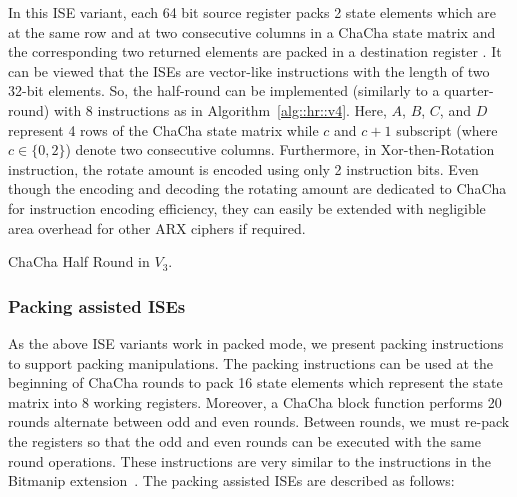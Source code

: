 In this ISE variant, each 64 bit source register packs 2 state elements which are at the same row and at two consecutive columns in a ChaCha state matrix and the corresponding two returned elements are packed in a destination register . It can be viewed that the ISEs are vector-like instructions with the length of two 32-bit elements. So, the half-round can be implemented (similarly to a quarter-round) with 8 instructions as in Algorithm~\ref{alg::hr::v4}. Here, $A$, $B$, $C$, and $D$ represent 4 rows of the ChaCha state matrix while $c$ and $c+1$ subscript (where $c \in\{0,2\}$) denote two consecutive columns.
Furthermore, in Xor-then-Rotation instruction, the rotate amount  is encoded using only 2 instruction bits.
Even though the encoding and decoding the rotating amount are dedicated to ChaCha for instruction encoding efficiency, 
they can easily be extended with negligible area overhead for other ARX ciphers if required.

\begin{algorithm}
\BlankLine
{}
\caption{ChaCha Half Round in $V_3$.}
\label{alg::hr::v4}
\end{algorithm}

\subsubsection{Packing assisted ISEs}
As the above ISE variants work in packed mode, we present packing instructions to support packing manipulations.
The packing instructions can be used at the beginning of ChaCha rounds to pack 16 state elements which represent the state matrix into 8 working registers. 
Moreover, a ChaCha block function performs 20 rounds alternate between odd and even rounds. Between rounds, we must re-pack the registers so that the odd and even rounds can be executed with the same round operations. These instructions are very similar to the  instructions in the Bitmanip extension~\cite{riscv:bitmanip:draft}. The packing assisted ISEs are described as follows:

